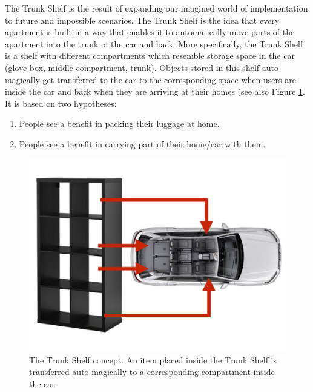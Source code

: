 \label{app:HPIPrototypes}

\label{sec:trunkshelf}

The Trunk Shelf is the result of expanding our imagined world of implementation to future and impossible scenarios. The Trunk Shelf is the idea that every apartment is built in a way that enables it to automatically move parts of the apartment into the trunk of the car and back. More specifically, the Trunk Shelf is a shelf with different compartments which resemble storage space in the car (glove box, middle compartment, trunk). Objects stored in this shelf auto-magically get transferred to the car to the corresponding space when users are inside the car and back when they are arriving at their homes (see also Figure \ref{fig:trunkshelf}. It is based on two hypotheses:

\begin{enumerate}
    \item People see a benefit in packing their luggage at home.
    \item People see a benefit in carrying part of their home/car with them.
\end{enumerate}

\begin{figure}[ht]
\centering
	\includegraphics[keepaspectratio, width=\textwidth]{Figures/Prototypes/DarkHorse/TrunkShelf}
	\caption[appears in list of figures]{The Trunk Shelf concept. An item placed inside the Trunk Shelf is transferred auto-magically to a corresponding compartment inside the car.\protect\footnotemark}
	\label{fig:trunkshelf}
\end{figure}

